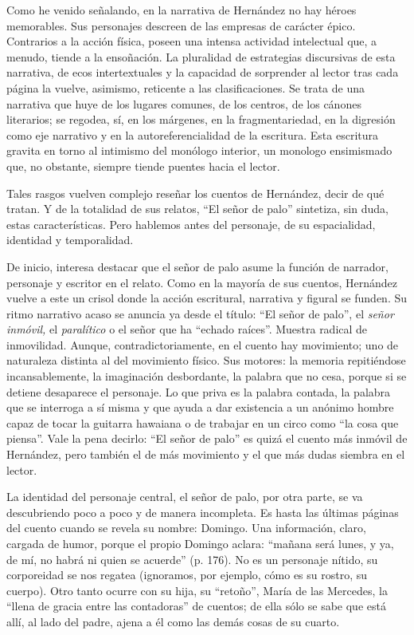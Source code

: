 \documentclass[14pt,twoside,final]{extbook} %
\begin{document}
Como he venido señalando, en la narrativa de Hernández no hay héroes memorables. Sus personajes descreen de las empresas de carácter épico. Contrarios a la acción física, poseen una intensa actividad intelectual que, a menudo, tiende a la ensoñación. La pluralidad de estrategias discursivas de esta narrativa, de ecos intertextuales y la capacidad de sorprender al lector tras cada página la
vuelve, asimismo, reticente a las clasificaciones. Se trata de una narrativa que huye de los lugares comunes, de los centros, de los cánones literarios; se regodea, sí, en los márgenes, en la fragmentariedad, en la digresión como eje narrativo y en la autoreferencialidad de la escritura. Esta escritura gravita en torno al intimismo del monólogo interior, un monologo ensimismado que, no obstante, siempre tiende puentes hacia el lector.

Tales rasgos vuelven complejo reseñar los cuentos de Hernández, decir de qué tratan. Y de la totalidad de sus relatos, ``El señor de palo'' sintetiza, sin duda, estas características. Pero hablemos antes del personaje, de su espacialidad, identidad y temporalidad.

De inicio, interesa destacar que el señor de palo asume la función de narrador, personaje y escritor en el relato. Como en la mayoría de sus cuentos, Hernández vuelve a este un crisol donde la acción escritural, narrativa y figural se funden. Su ritmo narrativo acaso se anuncia ya desde el título: ``El señor de palo'', el \emph{señor inmóvil,} el \emph{paralítico} o el señor que ha ``echado raíces''. Muestra radical de inmovilidad. Aunque, contradictoriamente, en el cuento hay movimiento; uno de naturaleza distinta al del movimiento físico. Sus motores: la memoria repitiéndose incansablemente, la imaginación desbordante, la palabra que no cesa, porque si se detiene desaparece el personaje. Lo que priva es la palabra contada, la palabra que se interroga a sí misma y que ayuda a dar existencia a un anónimo hombre capaz de tocar la guitarra hawaiana o de trabajar en un circo como ``la cosa que piensa''. Vale la pena decirlo: ``El señor de palo'' es quizá el cuento más inmóvil de Hernández, pero también el de más movimiento y el que más dudas siembra en el lector.

La identidad del personaje central, el señor de palo, por otra parte, se va descubriendo poco a poco y de manera incompleta. Es hasta las últimas páginas del cuento cuando se revela su nombre: Domingo. Una información, claro, cargada de humor, porque el propio Domingo aclara: ``mañana será lunes, y ya, de mí, no habrá ni quien se acuerde'' (p. 176). No es un personaje nítido, su corporeidad se nos regatea (ignoramos, por ejemplo, cómo es su rostro, su cuerpo). Otro tanto ocurre con su hija, su ``retoño'', María de las Mercedes, la ``llena de gracia entre las contadoras'' de cuentos; de ella sólo se sabe que está allí, al lado del padre, ajena a él como las demás cosas de su cuarto.
\end{document}
